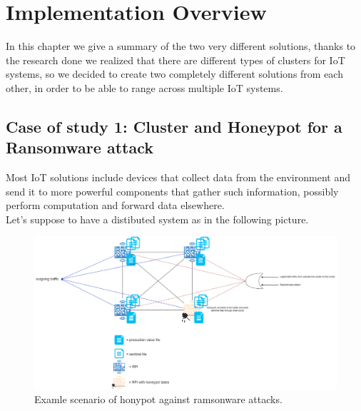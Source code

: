 \chapter{Implementation Overview}

In this chapter we give a summary of the two very different solutions, thanks to the research done we realized that there are different types of clusters for IoT systems, so we decided to create two completely different solutions from each other, in order to be able to range across multiple IoT systems.

\section{Case of study 1: Cluster and Honeypot for a Ransomware attack}

Most IoT solutions include devices that collect data from the environment and send it to more powerful components that gather such information, possibly perform computation and forward data elsewhere.\\
Let's suppose to have a distibuted system as in the following picture.


\begin{figure}[h!]
  \centering
  \includegraphics[width = 16cm]{images/ramsonwareHoneypot.png}
  \caption{ Examle scenario of honypot against ramsonware attacks.}
  \label{fig:irradiances}
\end{figure}
\FloatBarrier

